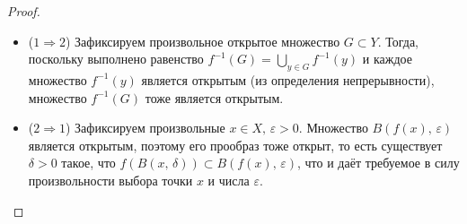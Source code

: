 \documentclass[a4paper,12pt]{article}
\theoremstyle{plain}
\theoremstyle{definition}
\theoremstyle{remark}
\begin{document}
\begin{proof}
  \begin{itemize}
    \item ($1 \Rightarrow 2$) Зафиксируем произвольное открытое множество $G \subset Y$. Тогда, поскольку выполнено равенство $f^{-1}(G) = \bigcup_{y \in G}f^{-1}(y)$ и каждое множество $f^{-1}(y)$ является открытым (из определения непрерывности), множество $f^{-1}(G)$ тоже является открытым.
    \item ($2 \Rightarrow 1$) Зафиксируем произвольные $x \in X,\, \varepsilon >0$. Множество $B(f(x),\, \varepsilon)$ является открытым, поэтому его прообраз тоже открыт, то есть существует $\delta >0$ такое, что $f(B(x,\, \delta)) \subset B(f(x),\, \varepsilon)$, что и даёт требуемое в силу произвольности выбора точки $x$ и числа $\varepsilon$.
  \end{itemize}
\end{proof}
\end{document}

